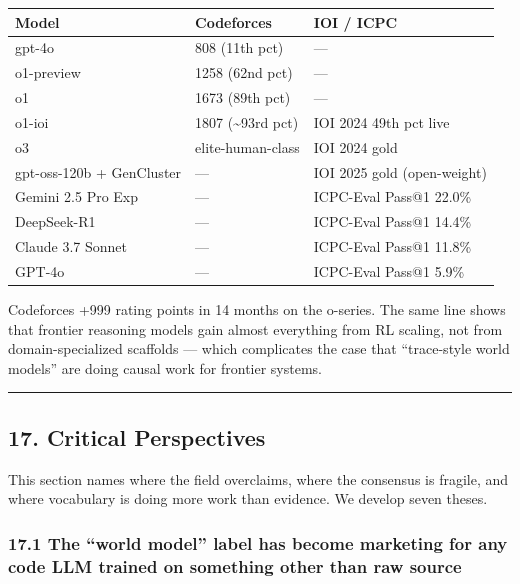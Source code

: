 \documentclass{article}
\begin{document}
\begin{longtable}[]{@{}lll@{}}
\toprule
Model & Codeforces & IOI / ICPC \\
\midrule
\endhead
gpt-4o & 808 (11th pct) & --- \\
o1-preview & 1258 (62nd pct) & --- \\
o1 & 1673 (89th pct) & --- \\
o1-ioi & 1807 (\textasciitilde93rd pct) & IOI 2024 49th pct live \\
o3 & elite-human-class & IOI 2024 gold \\
gpt-oss-120b + GenCluster & --- & IOI 2025 gold (open-weight) \\
Gemini 2.5 Pro Exp & --- & ICPC-Eval Pass@1 22.0\% \\
DeepSeek-R1 & --- & ICPC-Eval Pass@1 14.4\% \\
Claude 3.7 Sonnet & --- & ICPC-Eval Pass@1 11.8\% \\
GPT-4o & --- & ICPC-Eval Pass@1 5.9\% \\
\bottomrule
\end{longtable}

Codeforces +999 rating points in 14 months on the o-series. The same
line shows that frontier reasoning models gain almost everything from RL
scaling, not from domain-specialized scaffolds --- which complicates the
case that ``trace-style world models'' are doing causal work for
frontier systems.

\begin{center}\rule{0.5\linewidth}{0.5pt}\end{center}

\hypertarget{critical-perspectives}{%
\subsection{17. Critical Perspectives}\label{critical-perspectives}}

This section names where the field overclaims, where the consensus is
fragile, and where vocabulary is doing more work than evidence. We
develop seven theses.

\hypertarget{the-world-model-label-has-become-marketing-for-any-code-llm-trained-on-something-other-than-raw-source}{%
\subsubsection{17.1 The ``world model'' label has become marketing for
any code LLM trained on something other than raw
source}\label{the-world-model-label-has-become-marketing-for-any-code-llm-trained-on-something-other-than-raw-source}}
\end{document}
